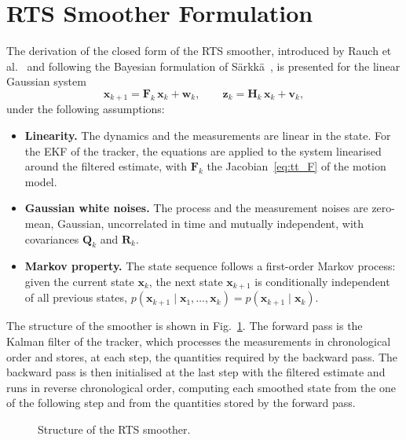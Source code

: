 \section{RTS Smoother Formulation}
\label{sec:rts_formulation}

The derivation of the closed form of the RTS smoother, introduced by Rauch et al.~\cite{rauch1965}
and following the Bayesian formulation of S\"arkk\"a~\cite{sarkka2013book}, is presented for the linear Gaussian system
\begin{equation}
    \mathbf{x}_{k+1} = \mathbf{F}_k\,\mathbf{x}_k + \mathbf{w}_k,
    \qquad
    \mathbf{z}_k = \mathbf{H}_k\,\mathbf{x}_k + \mathbf{v}_k,
    \label{eq:rts_linear}
\end{equation}
under the following assumptions: 
\begin{itemize}
    \item \textbf{Linearity.} The dynamics and the measurements are linear in the state. For
    the EKF of the tracker, the equations are applied to the system linearised around the
    filtered estimate, with $\mathbf{F}_k$ the Jacobian~\eqref{eq:tt_F} of the motion model.
    \item \textbf{Gaussian white noises.} The process and the measurement noises are
    zero-mean, Gaussian, uncorrelated in time and mutually independent, with covariances
    $\mathbf{Q}_k$ and $\mathbf{R}_k$.
    \item \textbf{Markov property.} The state sequence follows a first-order Markov process:
    given the current state $\mathbf{x}_k$, the next state $\mathbf{x}_{k+1}$ is conditionally
    independent of all previous states,
    $p(\mathbf{x}_{k+1} \mid \mathbf{x}_1, \dots, \mathbf{x}_k) =
    p(\mathbf{x}_{k+1} \mid \mathbf{x}_k)$.
\end{itemize}

The structure of the smoother is shown in Fig.~\ref{fig:rts_scheme}. The forward pass is the
Kalman filter of the tracker, which processes the measurements in chronological order and
stores, at each step, the quantities required by the backward pass. The backward pass is
then initialised at the last step with the filtered estimate and runs in reverse
chronological order, computing each smoothed state from the one of the following step and
from the quantities stored by the forward pass. 
\begin{figure}[H]
    \centering
    
    \caption{Structure of the RTS smoother.}
    \label{fig:rts_scheme}
\end{figure}

